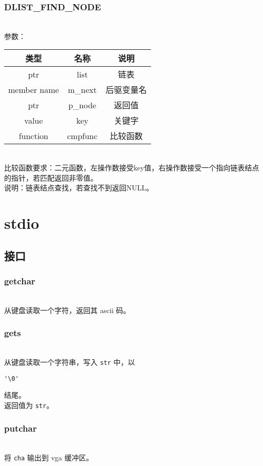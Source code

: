 \subsubsection{DLIST\_FIND\_NODE}
\\
参数：\\
\begin{tabular}{|c|c|c|}
    \hline
    类型 & 名称 & 说明\\\hline
    ptr & list & 链表\\\hline
    member name & m\_next & 后驱变量名\\\hline
    ptr & p\_node & 返回值\\\hline
    value & key & 关键字\\\hline
    function & cmpfunc & 比较函数\\\hline
\end{tabular}\\
比较函数要求：二元函数，左操作数接受key值，右操作数接受一个指向链表结点的指针，若匹配返回非零值。\\
说明：链表结点查找，若查找不到返回NULL。

\section{stdio}

\subsection{接口}

\subsubsection{getchar}
 \\
从键盘读取一个字符，返回其 ascii 码。

\subsubsection{gets}
 \\
从键盘读取一个字符串，写入 \texttt{str} 中，以 \begin{verbatim}'\0'\end{verbatim} 结尾。\\
返回值为 \texttt{str}。

\subsubsection{putchar}
 \\
将 \texttt{cha} 输出到 vga 缓冲区。

